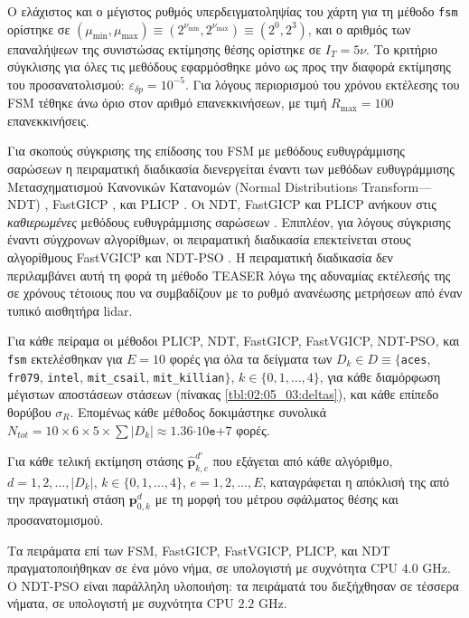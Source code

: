 Ο ελάχιστος και ο μέγιστος ρυθμός υπερδειγματοληψίας του χάρτη για τη μέθοδο
\texttt{fsm} ορίστηκε σε $(\mu_{\min},\mu_{\max}) \equiv
(2^{\nu_{\min}},2^{\nu_{\max}}) \equiv (2^0,2^3)$, και ο αριθμός των
επαναλήψεων της συνιστώσας εκτίμησης θέσης ορίστηκε σε $I_T=5\nu$. Το κριτήριο
σύγκλισης για όλες τις μεθόδους εφαρμόσθηκε μόνο ως προς την διαφορά εκτίμησης
του προσανατολισμού: $\varepsilon_{\delta p} = 10^{-5}$. Για λόγους περιορισμού
του χρόνου εκτέλεσης του FSM τέθηκε άνω όριο στον αριθμό επανεκκινήσεων, με
τιμή $R_{\max} = 100$ επανεκκινήσεις.

Για σκοπούς σύγκρισης της επίδοσης του FSM με μεθόδους ευθυγράμμισης σαρώσεων η
πειραματική διαδικασία διενεργείται έναντι των μεθόδων ευθυγράμμισης
Μετασχηματισμού Κανονικών Κατανομών (Normal Distributions Transform---NDT)
\cite{Bibera,ndt_code}, FastGICP \cite{Segal2009a,fgicp_code}, και PLICP
\cite{Censi2008a,plicp_code}. Οι NDT, FastGICP και PLICP ανήκουν στις
\textit{καθιερωμένες} μεθόδους ευθυγράμμισης σαρώσεων
\cite{Koide2021a,Xu2018b,Sobreira2019b,Pishehvari2019b,Qingshan2019c,Pham2021b}.
Επιπλέον, για λόγους σύγκρισης έναντι σύγχρονων αλγορίθμων, οι πειραματική
διαδικασία επεκτείνεται στους αλγορίθμους FastVGICP
\cite{Koide2021a,fgicp_code} και NDT-PSO \cite{Bouraine2021,ndt_pso_code}. Η
πειραματική διαδικασία δεν περιλαμβάνει αυτή τη φορά τη μέθοδο TEASER λόγω της
αδυναμίας εκτέλεσής της σε χρόνους τέτοιους που να συμβαδίζουν με το ρυθμό
ανανέωσης μετρήσεων από έναν τυπικό αισθητήρα lidar.

Για κάθε πείραμα οι μέθοδοι PLICP, NDT, FastGICP, FastVGICP, NDT-PSO, και
\texttt{fsm} εκτελέσθηκαν για $E = 10$ φορές για όλα τα δείγματα των $D_k \in D
\equiv \{$\texttt{aces}, \texttt{fr079}, \texttt{intel}, \texttt{mit\_csail},
\texttt{mit\_killian}$\}$, $k \in \{0,1,\dots,4\}$, για κάθε διαμόρφωση
μέγιστων αποστάσεων στάσεων (πίνακας \ref{tbl:02:05_03:deltas}), και κάθε
επίπεδο θορύβου $\sigma_R$.  Επομένως κάθε μέθοδος δοκιμάστηκε συνολικά
$N_{tot} = 10 \times 6 \times 5 \times \sum |D_k|\approx
1.36$$\cdot10$$\texttt{e}$$+$$7$ φορές.

Για κάθε τελική εκτίμηση στάσης $\hat{\bm{p}}_{k,e}^{d\prime}$ που εξάγεται από
κάθε αλγόριθμο, $d = 1,2,\dots,|D_k|$, $k \in \{0,1,\dots,4\}$,
$e=1,2,\dots,E$, καταγράφεται η απόκλισή της από την πραγματική στάση
$\bm{p}_{0,k}^d$ με τη μορφή του μέτρου σφάλματος θέσης και προσανατομισμού.

Τα πειράματα επί των FSM, FastGICP, FastVGICP, PLICP, και NDT πραγματοποιήθηκαν
σε ένα μόνο νήμα, σε υπολογιστή με συχνότητα CPU $4.0$ GHz. Ο NDT-PSO είναι
παράλληλη υλοποιήση: τα πειράματά του διεξήχθησαν σε τέσσερα νήματα, σε
υπολογιστή με συχνότητα CPU $2.2$ GHz.




